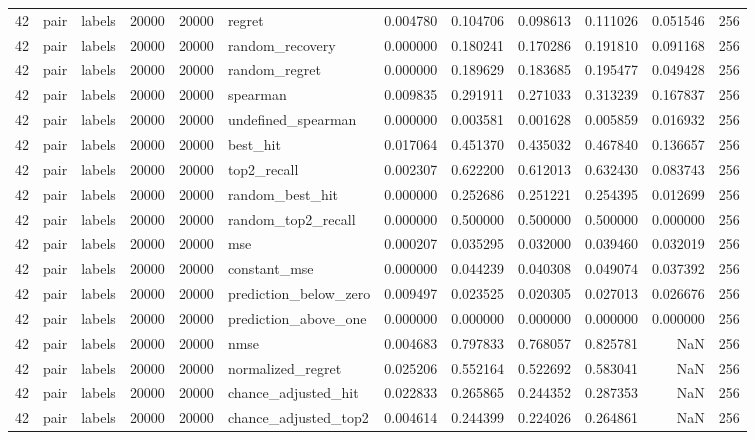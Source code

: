 \begin{tabular}{rllrrlrrrrrr}
42 & pair & labels & 20000 & 20000 & regret & 0.004780 & 0.104706 & 0.098613 & 0.111026 & 0.051546 & 256 \\
42 & pair & labels & 20000 & 20000 & random_recovery & 0.000000 & 0.180241 & 0.170286 & 0.191810 & 0.091168 & 256 \\
42 & pair & labels & 20000 & 20000 & random_regret & 0.000000 & 0.189629 & 0.183685 & 0.195477 & 0.049428 & 256 \\
42 & pair & labels & 20000 & 20000 & spearman & 0.009835 & 0.291911 & 0.271033 & 0.313239 & 0.167837 & 256 \\
42 & pair & labels & 20000 & 20000 & undefined_spearman & 0.000000 & 0.003581 & 0.001628 & 0.005859 & 0.016932 & 256 \\
42 & pair & labels & 20000 & 20000 & best_hit & 0.017064 & 0.451370 & 0.435032 & 0.467840 & 0.136657 & 256 \\
42 & pair & labels & 20000 & 20000 & top2_recall & 0.002307 & 0.622200 & 0.612013 & 0.632430 & 0.083743 & 256 \\
42 & pair & labels & 20000 & 20000 & random_best_hit & 0.000000 & 0.252686 & 0.251221 & 0.254395 & 0.012699 & 256 \\
42 & pair & labels & 20000 & 20000 & random_top2_recall & 0.000000 & 0.500000 & 0.500000 & 0.500000 & 0.000000 & 256 \\
42 & pair & labels & 20000 & 20000 & mse & 0.000207 & 0.035295 & 0.032000 & 0.039460 & 0.032019 & 256 \\
42 & pair & labels & 20000 & 20000 & constant_mse & 0.000000 & 0.044239 & 0.040308 & 0.049074 & 0.037392 & 256 \\
42 & pair & labels & 20000 & 20000 & prediction_below_zero & 0.009497 & 0.023525 & 0.020305 & 0.027013 & 0.026676 & 256 \\
42 & pair & labels & 20000 & 20000 & prediction_above_one & 0.000000 & 0.000000 & 0.000000 & 0.000000 & 0.000000 & 256 \\
42 & pair & labels & 20000 & 20000 & nmse & 0.004683 & 0.797833 & 0.768057 & 0.825781 & NaN & 256 \\
42 & pair & labels & 20000 & 20000 & normalized_regret & 0.025206 & 0.552164 & 0.522692 & 0.583041 & NaN & 256 \\
42 & pair & labels & 20000 & 20000 & chance_adjusted_hit & 0.022833 & 0.265865 & 0.244352 & 0.287353 & NaN & 256 \\
42 & pair & labels & 20000 & 20000 & chance_adjusted_top2 & 0.004614 & 0.244399 & 0.224026 & 0.264861 & NaN & 256 \\

\end{tabular}

